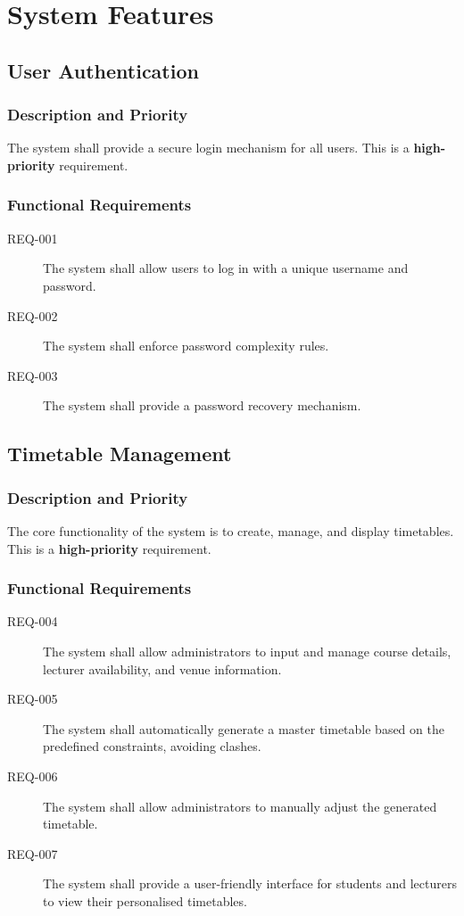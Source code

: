 \documentclass[11pt, a4paper]{article}
\begin{document}
\section{System Features}
\label{sec:system_features}

\subsection{User Authentication}
\label{sec:auth}
\subsubsection{Description and Priority}
The system shall provide a secure login mechanism for all users. This is a \textbf{high-priority} requirement.

\subsubsection{Functional Requirements}
\begin{description}
    \item[REQ-001] The system shall allow users to log in with a unique username and password.
    \item[REQ-002] The system shall enforce password complexity rules.
    \item[REQ-003] The system shall provide a password recovery mechanism.
\end{description}

\subsection{Timetable Management}
\label{sec:timetable_management}
\subsubsection{Description and Priority}
The core functionality of the system is to create, manage, and display timetables. This is a \textbf{high-priority} requirement.

\subsubsection{Functional Requirements}
\begin{description}
    \item[REQ-004] The system shall allow administrators to input and manage course details, lecturer availability, and venue information.
    \item[REQ-005] The system shall automatically generate a master timetable based on the predefined constraints, avoiding clashes.
    \item[REQ-006] The system shall allow administrators to manually adjust the generated timetable.
    \item[REQ-007] The system shall provide a user-friendly interface for students and lecturers to view their personalised timetables.
\end{description}
\end{document}
